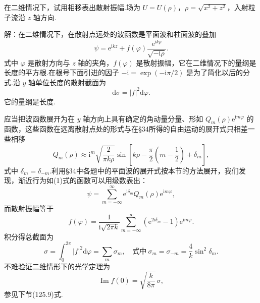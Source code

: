 \begin{xiti}
\setcounter{equation}{0}%

\quad 在二维情况下，试用相移表出散射振幅.场为 $U=U(\rho)$，$\rho=\sqrt{x^2+z^2}$，入射粒子流沿 $z$ 轴方向.

解：在二维情况下，在散射点远处的波函数是平面波和柱面波的叠加
\begin{equation}
  \psi=\mathrm{e}^{\mathrm{i}kz}
  +f(\varphi)\frac{\mathrm{e}^{\mathrm{i}k\rho}}{\sqrt{-\mathrm{i}\rho}}.
\end{equation}
式中 $\varphi$ 是散射方向与 $z$ 轴的夹角，$f(\varphi)$ 是散射振幅，它在二维情况下的量纲是长度的平方根.在根号下面引进的因子 $-\mathrm{i}=\exp(-\mathrm{i}\pi/2)$ 是为了简化以后的分式.沿 $y$ 轴单位长度的散射截面为
\begin{equation*}
  \mathrm{d}\sigma=|f|^2\mathrm{d}\varphi.
\end{equation*}
它的量纲是长度.

应当把波函数展开为在 $y$ 轴方向上具有确定的角动量分量、形如 $Q_m(\rho)\mathrm{e}^{\mathrm{i}m\varphi}$ 的函数，这些函数在远离散射点处的形式与在§34所得的自由运动的展开式只相差一些相移
\begin{equation*}
  Q_m(\rho)\approx\mathrm{i}^m\sqrt{\frac{2}{\pi k\rho}}
  \sin\left[k\rho-\frac{\pi}{2}\left(m-\frac{1}{2}\right)+\delta_m\right],
\end{equation*}
式中 $\delta_m=\delta_{-m}$.利用§34中各题中的平面波的展开式按本节的方法展开，我们发现，渐近行为如(1)式的函数可以用级数表出：
\begin{equation*}
  \psi=\sum_{m=-\infty}^{\infty}\mathrm{e}^{\mathrm{i}\delta_m}
  Q_m(\rho)\mathrm{e}^{\mathrm{i}m\varphi},
\end{equation*}
而散射振幅等于
\begin{equation}
  f(\varphi)=\frac{1}{\mathrm{i}\sqrt{2\pi k}}
  \sum_{m=-\infty}^{\infty}\left(\mathrm{e}^{2\mathrm{i}\delta_m}-1\right)
  \mathrm{e}^{\mathrm{i}m\varphi}.
\end{equation}
积分得总截面为
\begin{equation}
  \sigma=\int_0^{2\pi}|f|^2\mathrm{d}\varphi=\sum_m\sigma_m,
  \quad\text{式中}\ \sigma_m=\sigma_{-m}=\frac{4}{k}\sin^2\delta_m.
\end{equation}
不难验证二维情形下的光学定理为
\begin{equation*}
  \operatorname{Im}f(0)=\sqrt{\frac{k}{8\pi}}\,\sigma,
\end{equation*}
参见下节(125.9)式.

\end{xiti}

